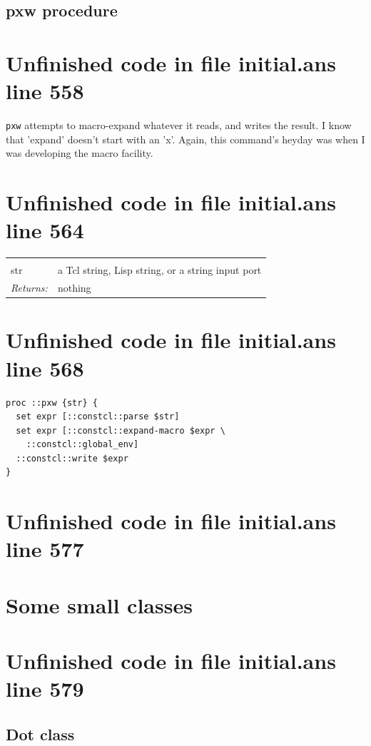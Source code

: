 \documentclass[twoside,9pt]{report}
\begin{document}
\subsection{pxw procedure}
\label{pxw-procedure}
\section{Unfinished code in file initial.ans line 558}


\texttt{pxw} attempts to macro-expand whatever it reads, and writes the result. I know that 'expand' doesn't start with an 'x'. Again, this command's heyday was when I was developing the macro facility.

\section{Unfinished code in file initial.ans line 564}
\noindent\begin{tabular}{ |p{1.9cm} p{8cm}| }
\hline
\rowcolor[HTML]{CCCCCC} \multicolumn{2}{|l|}{\bf pxw (internal)} \\
str & a Tcl string, Lisp string, or a string input port \\
\textit{Returns:} & nothing \\
\hline
\end{tabular}
\section{Unfinished code in file initial.ans line 568}
\begin{lstlisting}
proc ::pxw {str} {
  set expr [::constcl::parse $str]
  set expr [::constcl::expand-macro $expr \
    ::constcl::global_env]
  ::constcl::write $expr
}
\end{lstlisting}
\section{Unfinished code in file initial.ans line 577}
\section{Some small classes}
\label{some-small-classes}
\section{Unfinished code in file initial.ans line 579}
\subsection{Dot class}
\label{dot-class}
\end{document}
